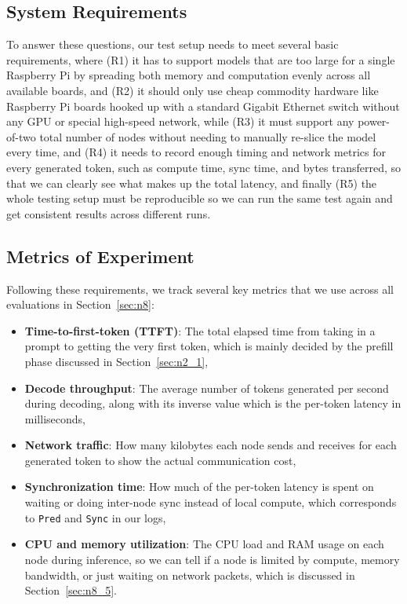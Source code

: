 \documentclass[11pt,a4paper]{article}
\begin{document}
\subsection{System Requirements}\label{sec:n4_2}

To answer these questions, our test setup needs to meet several basic requirements, where (R1) it has to support models that are too large for a single Raspberry Pi by spreading both memory and computation evenly across all available boards, and (R2) it should only use cheap commodity hardware like Raspberry Pi boards hooked up with a standard Gigabit Ethernet switch without any GPU or special high-speed network, while (R3) it must support any power-of-two total number of nodes without needing to manually re-slice the model every time, and (R4) it needs to record enough timing and network metrics for every generated token, such as compute time, sync time, and bytes transferred, so that we can clearly see what makes up the total latency, and finally (R5) the whole testing setup must be reproducible so we can run the same test again and get consistent results across different runs.

\subsection{Metrics of Experiment}\label{sec:n4_3}

Following these requirements, we track several key metrics that we use across all evaluations in Section~\ref{sec:n8}:

\begin{itemize}
\item \textbf{Time-to-first-token (TTFT)}: The total elapsed time from taking in a prompt to getting the very first token, which is mainly decided by the prefill phase discussed in Section~\ref{sec:n2_1},
\item \textbf{Decode throughput}: The average number of tokens generated per second during decoding, along with its inverse value which is the per-token latency in milliseconds,
\item \textbf{Network traffic}: How many kilobytes each node sends and receives for each generated token to show the actual communication cost,
\item \textbf{Synchronization time}: How much of the per-token latency is spent on waiting or doing inter-node sync instead of local compute, which corresponds to \texttt{Pred} and \texttt{Sync} in our logs,
\item \textbf{CPU and memory utilization}: The CPU load and RAM usage on each node during inference, so we can tell if a node is limited by compute, memory bandwidth, or just waiting on network packets, which is discussed in Section~\ref{sec:n8_5}.
\end{itemize}
\end{document}
